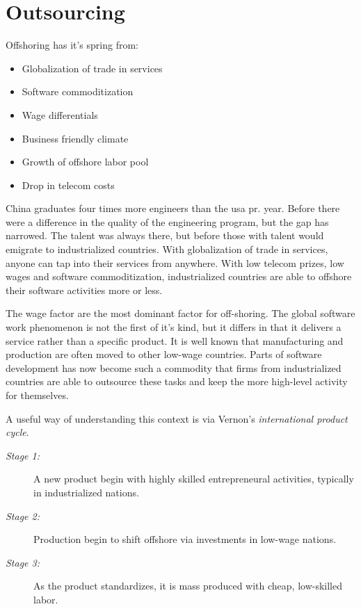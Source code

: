 \newpage
\section{Outsourcing}
Offshoring has it's spring from:

\begin{itemize}
\item Globalization of trade in services
\item Software commoditization
\item Wage differentials
\item Business friendly climate 
\item Growth of offshore labor pool
\item Drop in telecom costs
\end{itemize}

China graduates four times more engineers than the \gls{usa} pr. year. 
Before there were a difference in the quality of the engineering program, but the gap has narrowed. 
The talent was always there, but before those with talent would emigrate to industrialized countries. 
With globalization of trade in services, anyone can tap into their services from anywhere. 
With low telecom prizes, low wages and software commoditization, industrialized countries are able to offshore their software activities more or less. 

The wage factor are the most dominant factor for off-shoring.
The global software work phenomenon is not the first of it's kind, but it differs in that it delivers a service rather than a specific product. 
It is well known that manufacturing and production are often moved to other low-wage countries.
Parts of software development has now become such a commodity that firms from industrialized countries are able to outsource these tasks and keep the more high-level activity for themselves. 

A useful way of understanding this context is via Vernon's \textit{international product cycle}.
\begin{description}
\item[\textit{Stage 1:}]\hfill
A new product begin with highly skilled entrepreneural activities, typically in industrialized nations.
\item[\textit{Stage 2:}]\hfill
Production begin to shift offshore via investments in low-wage nations.
\item[\textit{Stage 3:}]\hfill
As the product standardizes, it is mass produced with cheap, low-skilled labor.
\end{description}


